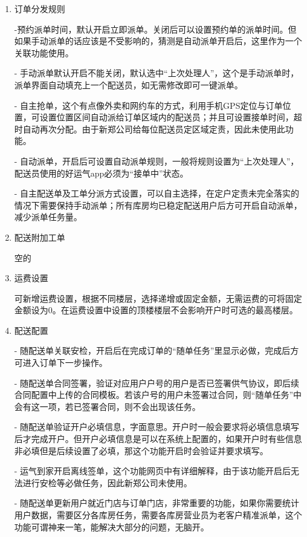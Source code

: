 \documentclass[UTF8]{ctexart}
\begin{document}
\begin{enumerate}
\item 订单分发规则

-预约派单时间，默认开启立即派单。关闭后可以设置预约单的派单时间。但如果手动派单的话应该是不受影响的，猜测是自动派单开启后，这里作为一个关联功能使用。

- 手动派单默认开启不能关闭，默认选中“上次处理人”，这个是手动派单时，派单界面自动填充上一个配送员，如无需修改即可一键派单。

- 自主抢单，这个有点像外卖和网约车的方式，利用手机GPS定位与订单位置，可设置位置区间自动派给订单区域内的配送员；并且可设置接单时间，超时自动再次分配。由于新郑公司给每位配送员定区域定责，因此未使用此功能。

- 自动派单，开启后可设置自动派单规则，一般将规则设置为“上次处理人”，配送员使用的好运气app必须为“接单中”状态。

- 自主配送单及工单分派方式设置，可以自主选择，在定户定责未完全落实的情况下需要保持手动派单；所有库房均已稳定配送用户后方可开启自动派单，减少派单任务量。

\item 配送附加工单

空的

\item 运费设置

可新增运费设置，根据不同楼层，选择递增或固定金额，无需运费的可将固定金额设为0。在运费设置中设置的顶楼楼层不会影响开户时可选的最高楼层。

\item 配送配置

- 随配送单关联安检，开启后在完成订单的“随单任务”里显示必做，完成后方可进入订单下一步操作。

- 随配送单合同签署，验证对应用户户号的用户是否已签署供气协议，即后续合同配置中上传的合同模板。若该户号的用户未签署过合同，则“随单任务”中会有这一项，若已签署合同，则不会出现该任务。

- 随配送单验证开户必填信息，字面意思。开户时一般会要求将必填信息填写后才完成开户。但开户必填信息是可以在系统上配置的，如果开户时有些信息非必填但是后续设置了必填，那这个功能开启时会验证并要求填写。

- 运气到家开启离线签单，这个功能网页中有详细解释，由于该功能开启后无法进行安检等必做任务，因此新郑公司未使用。

- 随配送单更新用户就近门店与订单门店，非常重要的功能，如果你需要统计用户数据，需要区分各库房任务，需要各库房营业员为老客户精准派单，这个功能可谓神来一笔，能解决大部分的问题，无脑开。

\end{enumerate}
\end{document}
